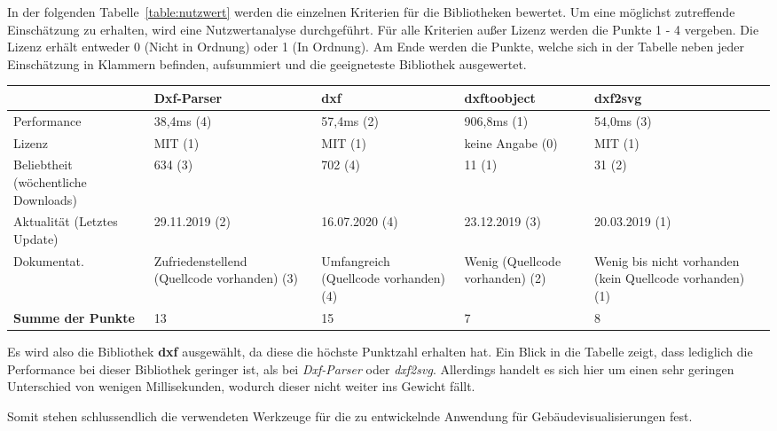 In der folgenden Tabelle~\ref{table:nutzwert} werden die einzelnen Kriterien für die Bibliotheken bewertet.
Um eine möglichst zutreffende Einschätzung zu erhalten, wird eine Nutzwertanalyse durchgeführt.
Für alle Kriterien außer Lizenz werden die Punkte 1 - 4 vergeben.
Die Lizenz erhält entweder 0 (Nicht in Ordnung) oder 1 (In Ordnung).
Am Ende werden die Punkte, welche sich in der Tabelle neben jeder Einschätzung in Klammern befinden, aufsummiert und die geeigneteste Bibliothek ausgewertet.

\begin{center}
    \scriptsize
    \begin{supertabular}{ p{1.4cm}|p{1.6cm}|p{1.5cm}|p{1.3cm}|p{1.3cm} }
        \label{table:nutzwert}
        & \textbf{Dxf-Parser} & \textbf{dxf} & \textbf{dxftoobject} & \textbf{dxf2svg} \\
        \hline
        Performance & 38,4ms (4) & 57,4ms (2) & 906,8ms (1) & 54,0ms (3) \\
        Lizenz & MIT (1) & MIT (1) & keine Angabe (0) & MIT (1) \\
        Beliebtheit (wöchentliche Downloads) & 634 (3) & 702 (4) & 11 (1) & 31 (2) \\
        Aktualität (Letztes Update) & 29.11.2019 (2) & 16.07.2020 (4) & 23.12.2019 (3) & 20.03.2019 (1) \\
        Dokumentat. & Zufriedenstellend (Quellcode vorhanden) (3) & Umfangreich (Quellcode vorhanden) (4) & Wenig (Quellcode vorhanden) (2) & Wenig bis nicht vorhanden (kein Quellcode vorhanden) (1) \\
        \hline
        \textbf{Summe der Punkte} & 13 & 15 & 7 & 8 \\
    \end{supertabular}
\end{center}

Es wird also die Bibliothek \textbf{dxf} ausgewählt, da diese die höchste Punktzahl erhalten hat.
Ein Blick in die Tabelle zeigt, dass lediglich die Performance bei dieser Bibliothek geringer ist, als bei \textit{Dxf-Parser} oder \textit{dxf2svg}.
Allerdings handelt es sich hier um einen sehr geringen Unterschied von wenigen Millisekunden, wodurch dieser nicht weiter ins Gewicht fällt.

Somit stehen schlussendlich die verwendeten Werkzeuge für die zu entwickelnde Anwendung für Gebäudevisualisierungen fest.

